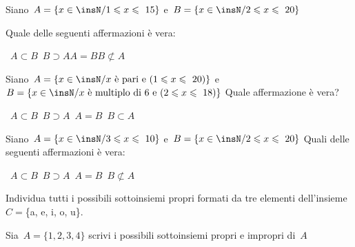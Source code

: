 \begin{esercizio}
\label{ese:7.39}
Siano~$A=\{x\in\insN/1\leqslant x\leqslant~15\}$ e~$B=\{x\in\insN/2\leqslant 
x\leqslant~20\}$
\begin{center}

\end{center}
Quale delle seguenti affermazioni è vera:
\begin{center}
\boxA\quad~$A\subset B$\quad\boxB\quad~$B\supset 
A$\quad\boxC\quad$A=B$\quad\boxD\quad$B\not\subset A$
\end{center}
\end{esercizio}

\begin{esercizio}
\label{ese:7.40}
 Siano~$A=\{x\in\insN/x \text{ è pari e }(1\leqslant x\leqslant~20)\}$ 
e~$B=\{x\in\insN/x \text{ è multiplo di~6 e }(2\leqslant x\leqslant~18)\}$
Quale affermazione è vera?
\begin{center}
 \boxA\quad~$A\subset B$\quad\boxB\quad~$B\supset 
A$\quad\boxC\quad~$A=B$\quad\boxD\quad~$B\subset A$
\end{center}
\end{esercizio}

\begin{esercizio}
\label{ese:7.41}
Siano~$A=\{x\in\insN/3\leqslant x\leqslant~10\}$ e~$B=\{x\in\insN/2\leqslant 
x\leqslant~20\}$
Quali delle seguenti affermazioni è vera:
\begin{center}
 \boxA\quad~$A\subset B$\quad\boxB\quad~$B\supset 
A$\quad\boxC\quad~$A=B$\quad\boxD\quad~$B\not\subset A$
\end{center}
\end{esercizio}

\begin{esercizio}
\label{ese:7.42}
Individua tutti i possibili sottoinsiemi propri formati da tre elementi 
dell'insieme~$C=$\{a, e, i, o, u\}.
\end{esercizio}

\begin{esercizio}
\label{ese:7.43}
Sia~$A=\{1,2,3,4\}$ scrivi i possibili sottoinsiemi propri e impropri di~$A$
\end{esercizio}

